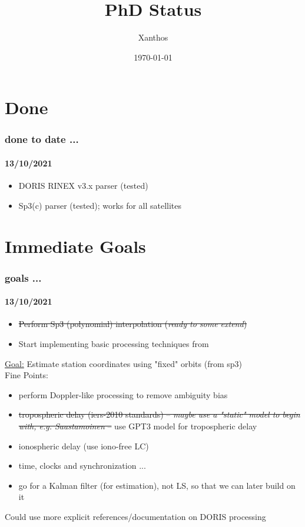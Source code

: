 \documentclass{beamer}
\title[]{PhD Status}
\author{Xanthos}
\institute{DSO \& IGN}
\date{\today}
\begin{document}
\begin{frame}
  \titlepage
\end{frame}


\section{Done}

\begin{frame}\frametitle{done to date ...}\framesubtitle{13/10/2021}

\begin{itemize}
    \item DORIS RINEX v3.x parser (tested)
    \item Sp3(c) parser (tested); works for all satellites
\end{itemize}

\end{frame}



\section{Immediate Goals}

\begin{frame}\frametitle{goals ...}\framesubtitle{13/10/2021}

\begin{itemize}
    \item \st{Perform Sp3 (polynomial) interpolation (\textit{ready to some extend})}
    \item Start implementing basic processing techniques from \cite{lemoine-2016}
\end{itemize}

\vspace{0.3cm}

\underline{Goal:} Estimate station coordinates using "fixed" orbits (from sp3)\\

Fine Points:
\begin{itemize}
    \item perform Doppler-like processing to remove ambiguity bias
    \item \st{tropospheric delay (iers-2010 standards) -- \textit{maybe use a "static" model to begin with, e.g. Saastamoinen} --} 
      use GPT3 model for tropospheric delay
    \item ionospheric delay (use iono-free LC)
    \item time, clocks and synchronization ...
    \item go for a Kalman filter (for estimation), not LS, so that we can later build on it
\end{itemize}

Could use more explicit references/documentation on DORIS processing

\end{frame}
\end{document}
